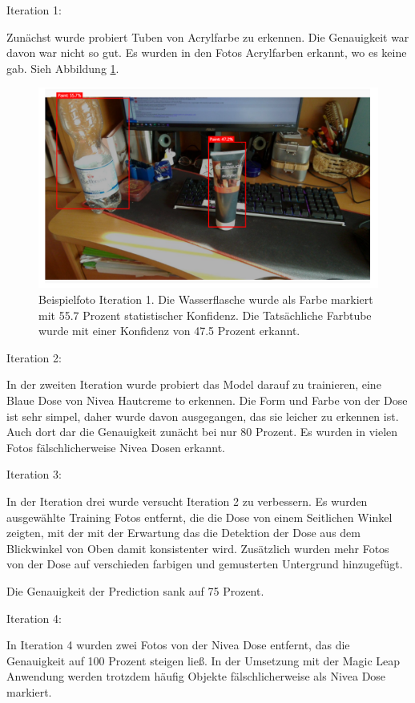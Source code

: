 \documentclass[german,a4paper, 12pt]{llncs}
\begin{document}
Iteration 1:

Zunächst wurde probiert Tuben von Acrylfarbe zu erkennen. Die Genauigkeit war davon war nicht so gut. Es wurden in den Fotos Acrylfarben erkannt, wo es keine gab. Sieh Abbildung \ref{image:customVisionPaint}. 

\begin{figure}[H]
	\centering
	\includegraphics[width=1.0\textwidth]{images/customVisionPaint.PNG}
	\caption[]{Beispielfoto Iteration 1. Die Wasserflasche wurde als Farbe markiert mit 55.7 Prozent statistischer Konfidenz. Die Tatsächliche Farbtube wurde mit einer Konfidenz von 47.5 Prozent erkannt.}
	\label{image:customVisionPaint}
\end{figure}

Iteration 2:

In der zweiten Iteration wurde probiert das Model darauf zu trainieren, eine Blaue Dose von Nivea Hautcreme to erkennen. Die Form und Farbe von der Dose ist sehr simpel, daher wurde davon ausgegangen, das sie leicher zu erkennen ist. Auch dort dar die Genauigkeit zunächt bei nur 80 Prozent. Es wurden in vielen Fotos fälschlicherweise Nivea Dosen erkannt.

Iteration 3:

In der Iteration drei wurde versucht Iteration 2 zu verbessern. Es wurden ausgewählte Training Fotos entfernt, die die Dose von einem Seitlichen Winkel zeigten, mit der mit der Erwartung das die Detektion der Dose aus dem Blickwinkel von Oben damit konsistenter wird. Zusätzlich wurden mehr Fotos von der Dose auf verschieden farbigen und gemusterten Untergrund hinzugefügt. 

Die Genauigkeit der Prediction sank auf 75 Prozent.

Iteration 4:

In Iteration 4 wurden zwei Fotos von der Nivea Dose entfernt, das die Genauigkeit auf 100 Prozent steigen ließ. In der Umsetzung mit der Magic Leap Anwendung werden trotzdem häufig Objekte fälschlicherweise als Nivea Dose markiert.
\end{document}
